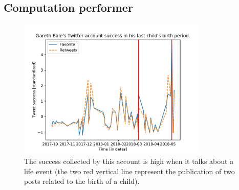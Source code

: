 \subsection{Computation performer}
\label{sec:computationperformer}

\begin{figure}
\centering
\includegraphics[width=%
0.8\textwidth]{img/bale}
\caption{The success collected by this account is high when it talks about a life event (the two red vertical line represent the publication of two posts related to the birth of a child).}
\label{fig:bale}
\end{figure}

